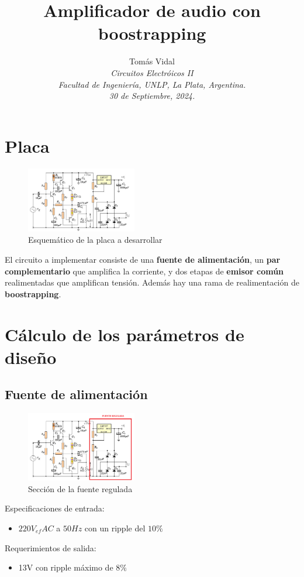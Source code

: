 \documentclass[letterpaper, 10 pt, conference]{ieeeconf}  %
\title{\LARGE \bf Amplificador de audio con boostrapping}
\author{
  Tom\'as Vidal\\
  {\it Circuitos Electróicos II}\\
  {\it Facultad de Ingenier\'ia, UNLP, La Plata, Argentina.}\\
  {\it 30 de Septiembre, 2024.}
}                                            %
\begin{document}
\maketitle
\thispagestyle{empty}
\pagestyle{empty}

\section{Placa}
\begin{figure}[H]
  \centering
  \includegraphics[width=0.43\textwidth]{./imagenes/placa.png}
  \caption{Esquemático de la placa a desarrollar}
  \label{fig:placa}
\end{figure}
El circuito a implementar consiste de una \textbf{fuente de alimentación}, un \textbf{par complementario} que amplifica la corriente, y dos etapas de \textbf{emisor común} realimentadas que amplifican tensión. Además hay una rama de realimentación de \textbf{boostrapping}.

\section{Cálculo de los parámetros de diseño}
\subsection{Fuente de alimentación}
\begin{figure}[H]
  \centering
  \includegraphics[width=0.43\textwidth]{./imagenes/placa_fuente.png}
  \caption{Sección de la fuente regulada}
  \label{fig:placa_fuente}
\end{figure}

Especificaciones de entrada:
\begin{itemize}
  \item{$220V_{ef} AC$ a $50Hz$ con un ripple del $10\%$}
\end{itemize}
Requerimientos de salida:
\begin{itemize}
  \item{13V con ripple máximo de $8\%$}
\end{itemize}
\end{document}
